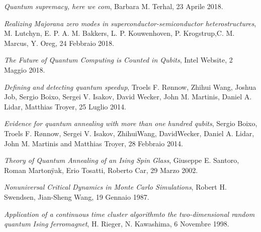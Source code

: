 \begin{thebibliography}{99}
    \textit{Quantum supremacy, here we com},
    Barbara M. Terhal,
    23 Aprile 2018.

    \textit{Realizing Majorana zero modes in superconductor-semiconductor heterostructures},
    M. Lutchyn, E. P. A. M. Bakkers, L. P. Kouwenhoven, P. Krogstrup,C. M. Marcus, Y. Oreg,
    24 Febbraio 2018.

    \textit{The Future of Quantum Computing is Counted in Qubits},
    Intel Website,
    2 Maggio 2018.

    \textit{Defining and detecting quantum speedup},
    Troels F. Rønnow, Zhihui Wang, Joshua Job, Sergio Boixo, Sergei V. Isakov, David Wecker, John M. Martinis, Daniel A. Lidar, Matthias Troyer,
    25 Luglio 2014.

    \textit{Evidence for quantum annealing with more than
one hundred qubits},
    Sergio Boixo, Troels F. Rønnow, Sergei V. Isakov, ZhihuiWang, DavidWecker, Daniel A. Lidar, John M. Martinis and Matthias Troyer,
    28 Febbraio 2014.

    \textit{Theory of Quantum Annealing of an Ising Spin Glass},
    Giuseppe E. Santoro, Roman Martonÿak, Erio Tosatti, Roberto Car,
    29 Marzo 2002.

    \textit{Nonuniversal Critical Dynamics in Monte Carlo Simulations},
    Robert H. Swendsen, Jian-Sheng Wang,
    19 Gennaio 1987.

    \textit{Application of a continuous time cluster algorithmto the two-dimensional random quantum Ising ferromagnet},
    H. Rieger, N. Kawashima,
    6 Novembre 1998.

\end{thebibliography}
